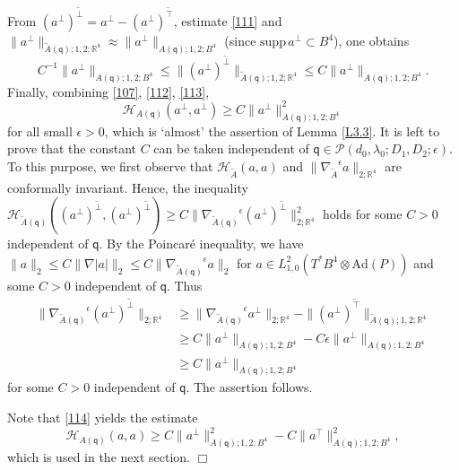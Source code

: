 \documentclass[11pt]{article}
\numberwithin{equation}{section} \setlength{\topmargin}{-35pt}
\newcommand{\PP}{\mathcal{P}}
\newcommand{\R}{\mathbb{R}}
\newcommand{\Ad}{\text{Ad}}
\newcommand{\q}{\mathsf{q}}
\newcommand{\ttilde}{\tilde{\intercal}}
\newcommand{\tperp}{\tilde{\perp}}
\begin{document}
From $(a^{\perp})^{\tperp}=a^{\perp}-(a^{\perp})^{\ttilde}$,
estimate \eqref{111} and
$\|a^{\perp}\|_{\tilde{A}(\q);1,2;\R^4}\approx\|a^{\perp}\|_{A(\q);1,2;B^4}$
(since $\text{supp}\,a^{\perp}\subset B^4$), one obtains
\begin{equation}
\label{113}
 C^{-1}\|a^{\perp}\|_{A(\q);1,2;B^4}\le
\|(a^{\perp})^{\tperp}\|_{\tilde{A}(\q);1,2;\R^4}\le
C\|a^{\perp}\|_{A(\q);1,2;B^4}.
\end{equation}
Finally, combining \eqref{107}, \eqref{112}, \eqref{113},
\begin{equation}
\label{114} \mathcal{H}_{A(\q)}(a^{\perp},a^{\perp})\ge
C\|a^{\perp}\|_{A(\q);1,2;B^4}^2
\end{equation}
for all small $\epsilon>0$, which is `almost' the assertion of Lemma
\ref{L3.3}. It is left to prove that the constant $C$ can be taken
independent of $\q\in\PP(d_0,\lambda_0;D_1,D_2;\epsilon)$. To this
purpose, we first observe that $\mathcal{H}_{\tilde{A}}(a,a)$ and
$\|{\nabla_{\tilde{A}}}^{\epsilon}a\|_{2;\R^4}$ are conformally
invariant. Hence, the inequality
$\mathcal{H}_{\tilde{A}(\q)}((a^{\perp})^{\tperp},(a^{\perp})^{\tperp})\ge
C\|{\nabla_{\tilde{A}(\q)}}^{\epsilon}(a^{\perp})^{\tperp}\|_{2;\R^4}^2$
holds for some $C>0$ independent of $\q$. By the Poincar\'e
inequality, we have $\|a\|_2\le C\|\nabla |a|\|_2\le
C\|{\nabla_{\tilde{A}(\q)}}^{\epsilon}a\|_2$ for $a\in
L^2_{1,0}(T^{\ast}B^4\otimes\Ad(P))$ and some $C>0$ independent of
$\q$. Thus
\begin{align*}
\|{\nabla_{\tilde{A}(\q)}}^{\epsilon}(a^{\perp})^{\tperp}\|_{2;\R^4}&\ge\|{\nabla_{\tilde{A}(\q)}}^{\epsilon}a^{\perp}\|_{2;\R^4}-
\|(a^{\perp})^{\ttilde}\|_{\tilde{A}(\q);1,2;\R^4}\\
&\ge C\|a^{\perp}\|_{A(\q);1,2;B^4}-C\epsilon\|a^{\perp}\|_{A(\q);1,2;B^4}\\
&\ge C\|a^{\perp}\|_{A(\q);1,2;B^4}
\end{align*}
for some $C>0$ independent of $\q$. The assertion follows.

\noindent Note that  \eqref{114}  yields the estimate
\begin{equation}
\label{115} \mathcal{H}_{A(\q)}(a,a)\ge
C\|a^{\perp}\|_{A(\q);1,2;B^4}^2-C\|a^{\intercal}\|_{A(\q);1,2;B^4}^2,
\end{equation}
which is used in the next section. \hfill$\Box$

\medskip
\end{document}

